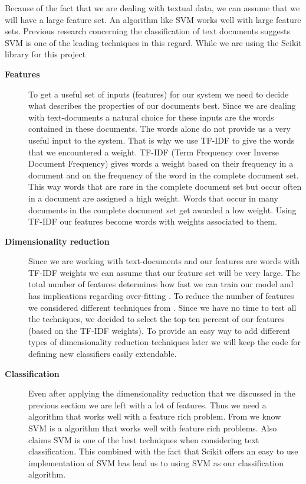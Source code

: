 Because of the fact that we are dealing with textual data, we can assume that we will have a large feature set. An algorithm like SVM \cite{ml_text} works well with large feature sets\cite{MLCheatSheet}.
Previous research concerning the classification of text documents suggests SVM is one of the leading techniques in this regard\cite{ml_text}. While we are using the Scikit library for this project 

\begin{description}
\item[\textbf{Features}] 
To get a useful set of inputs (features) for our system we need to decide what describes the properties of our documents best. Since we are dealing with text-documents a natural choice for these inputs are the words contained in these documents. 
The words alone do not provide us a very useful input to the system. That is why we use TF-IDF to give the words that we encountered a weight. TF-IDF (Term Frequency over Inverse Document Frequency) gives words a weight based on their frequency in a document and on the frequency of the word in the complete document set. This way words that are rare in the complete document set but occur often in a document are assigned a high weight. Words that occur in many documents in the complete document set get awarded a low weight\cite{ramos_tfidf}.
Using TF-IDF our features become words with weights associated to them.

\item[\textbf{Dimensionality reduction}]
Since we are working with text-documents and our features are words with TF-IDF weights we can assume that our feature set will be very large. The total number of features determines how fast we can train our model and has implications regarding over-fitting \cite{ml_text}. To reduce the number of features we considered different techniques from \cite{ml_text}. Since we have no time to test all the techniques, we decided to select the top ten percent of our features (based on the TF-IDF weights)\cite{yang1997}. To provide an easy way to add different types of dimensionality reduction techniques later we will keep the code for defining new classifiers easily extendable.

\item[\textbf{Classification}]
Even after applying the dimensionality reduction that we discussed in the previous section we are left with a lot of features. Thus we need a algorithm that works well with a feature rich problem. From \cite{MLCheatSheet} we know SVM is a algorithm that works well with feature rich problems. Also \cite{ml_text} claims SVM is one of the best techniques when considering text classification. This combined with the fact that Scikit offers an easy to use implementation of SVM has lead us to using SVM as our classification algorithm.
\end{description}

